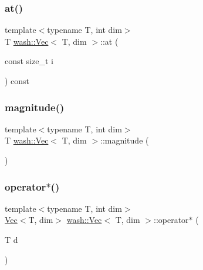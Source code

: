 \mbox{\label{classwash_1_1Vec_a1be26013b6d4f898b8504fc258043400}} 
\subsubsection{\texorpdfstring{at()}{at()}}
{\footnotesize\ttfamily template$<$typename T, int dim$>$ \\
T \mbox{\hyperlink{classwash_1_1Vec}{wash\+::\+Vec}}$<$ T, dim $>$\+::at (\begin{DoxyParamCaption}\item[{const size\+\_\+t}]{i }\end{DoxyParamCaption}) const\hspace{0.3cm}{\ttfamily [inline]}}

\mbox{\label{classwash_1_1Vec_a41de499daf12160b2cf515ce0c9da70f}} 
\subsubsection{\texorpdfstring{magnitude()}{magnitude()}}
{\footnotesize\ttfamily template$<$typename T, int dim$>$ \\
T \mbox{\hyperlink{classwash_1_1Vec}{wash\+::\+Vec}}$<$ T, dim $>$\+::magnitude (\begin{DoxyParamCaption}{ }\end{DoxyParamCaption})\hspace{0.3cm}{\ttfamily [inline]}}

\mbox{\label{classwash_1_1Vec_a6fc9e30b352c72c7307bd28ee6c0aa72}} 
\subsubsection{\texorpdfstring{operator$\ast$()}{operator*()}}
{\footnotesize\ttfamily template$<$typename T, int dim$>$ \\
\mbox{\hyperlink{classwash_1_1Vec}{Vec}}$<$T, dim$>$ \mbox{\hyperlink{classwash_1_1Vec}{wash\+::\+Vec}}$<$ T, dim $>$\+::operator$\ast$ (\begin{DoxyParamCaption}\item[{T}]{d }\end{DoxyParamCaption})\hspace{0.3cm}{\ttfamily [inline]}}

